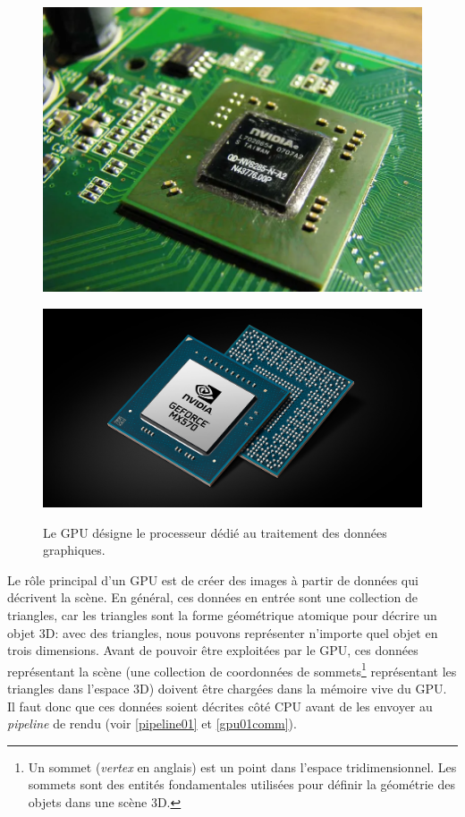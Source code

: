 \begin{figure}[h]
  \begin{minipage}[b]{0.45\linewidth}
    \centering
    \includegraphics[width=0.75\linewidth]{images//shaders/gpu00.png}
    \label{gpu00}
  \end{minipage}
  \hspace{0.1\linewidth} %
  \begin{minipage}[b]{0.45\linewidth}
    \centering
    \includegraphics[width=0.75\linewidth]{images/pipeline/cg01.jpg}
    \label{gpu01}
  \end{minipage}
  \caption{Le GPU désigne le processeur dédié au traitement des données graphiques.}
  \label{gpuproc}
\end{figure}

Le rôle principal d'un GPU est de créer des images à partir de données qui décrivent la scène. En général, ces données en entrée sont une collection de triangles, car les triangles sont la forme géométrique atomique pour décrire un objet 3D: avec des triangles, nous pouvons représenter n'importe quel objet en trois dimensions. Avant de pouvoir être exploitées par le GPU, ces données représentant la scène (une collection de coordonnées de sommets\footnote{Un sommet (\textit{vertex} en anglais) est un point dans l'espace tridimensionnel. Les sommets sont des entités fondamentales utilisées pour définir la géométrie des objets dans une scène 3D. } représentant les triangles dans l'espace 3D) doivent être chargées dans la mémoire vive du GPU. Il faut donc que ces données soient décrites côté CPU avant de les envoyer au \textit{pipeline} de rendu (voir \ref{pipeline01} et \ref{gpu01comm}).

